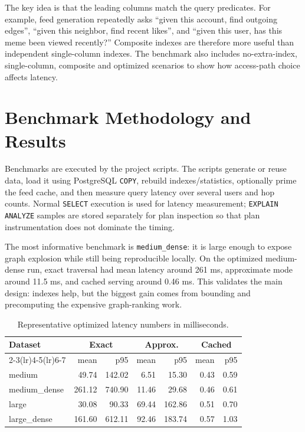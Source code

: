 \documentclass[11pt,a4paper]{article}
\begin{document}
The key idea is that the leading columns match the query predicates. For example, feed generation repeatedly asks ``given this account, find outgoing edges'', ``given this neighbor, find recent likes'', and ``given this user, has this meme been viewed recently?'' Composite indexes are therefore more useful than independent single-column indexes. The benchmark also includes no-extra-index, single-column, composite and optimized scenarios to show how access-path choice affects latency.

\section{Benchmark Methodology and Results}
Benchmarks are executed by the project scripts. The scripts generate or reuse data, load it using PostgreSQL \texttt{COPY}, rebuild indexes/statistics, optionally prime the feed cache, and then measure query latency over several users and hop counts. Normal \texttt{SELECT} execution is used for latency measurement; \texttt{EXPLAIN ANALYZE} samples are stored separately for plan inspection so that plan instrumentation does not dominate the timing.

The most informative benchmark is \texttt{medium\_dense}: it is large enough to expose graph explosion while still being reproducible locally. On the optimized medium-dense run, exact traversal had mean latency around 261 ms, approximate mode around 11.5 ms, and cached serving around 0.46 ms. This validates the main design: indexes help, but the biggest gain comes from bounding and precomputing the expensive graph-ranking work.

\begin{table}[H]
\centering
\caption{Representative optimized latency numbers in milliseconds.}
\begin{tabular}{lrrrrrr}
\toprule
Dataset & \multicolumn{2}{c}{Exact} & \multicolumn{2}{c}{Approx.} & \multicolumn{2}{c}{Cached} \\
\cmidrule(lr){2-3}\cmidrule(lr){4-5}\cmidrule(lr){6-7}
 & mean & p95 & mean & p95 & mean & p95 \\
\midrule
medium & 49.74 & 142.02 & 6.51 & 15.30 & 0.43 & 0.59 \\
medium\_dense & 261.12 & 740.90 & 11.46 & 29.68 & 0.46 & 0.61 \\
large & 30.08 & 90.33 & 69.44 & 162.86 & 0.51 & 0.70 \\
large\_dense & 161.60 & 612.11 & 92.46 & 183.74 & 0.57 & 1.03 \\
\bottomrule
\end{tabular}
\end{table}
\end{document}
